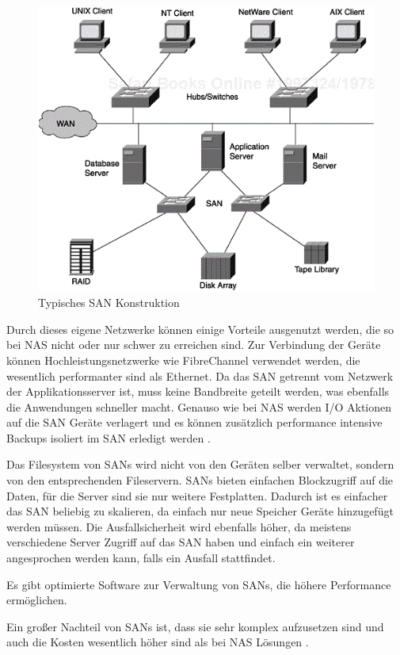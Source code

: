 \begin{figure}[hbt]
	\centering
	\includegraphics[scale=0.9]{images/storage-area-network}
	\caption{Typisches SAN Konstruktion \parencite[Kap. 1]{gupta.2002}}
	\label{fig:storageareanetwork}
\end{figure}

Durch dieses eigene Netzwerke können einige Vorteile ausgenutzt werden, die so bei NAS nicht oder nur schwer zu erreichen sind. Zur Verbindung der Geräte können Hochleistungsnetzwerke wie FibreChannel verwendet werden, die wesentlich performanter sind als Ethernet. Da das SAN getrennt vom Netzwerk der Applikationsserver ist, muss keine Bandbreite geteilt werden, was ebenfalls die Anwendungen schneller macht. Genauso wie bei NAS werden I/O Aktionen auf die SAN Geräte verlagert und es können zusätzlich performance intensive Backups isoliert im SAN erledigt werden \parencite[Kap. 1, SANs]{gupta.2002}.

Das Filesystem von SANs wird nicht von den Geräten selber verwaltet, sondern von den entsprechenden Fileservern. SANs bieten einfachen Blockzugriff auf die Daten, für die Server sind sie nur weitere Festplatten. Dadurch ist es einfacher das SAN beliebig zu skalieren, da einfach nur neue Speicher Geräte hinzugefügt werden müssen. Die Ausfallsicherheit wird ebenfalls höher, da meistens verschiedene Server Zugriff auf das SAN haben und einfach ein weiterer angesprochen werden kann, falls ein Ausfall stattfindet.

Es gibt optimierte Software zur Verwaltung von SANs, die höhere Performance ermöglichen.

Ein großer Nachteil von SANs ist, dass sie sehr komplex aufzusetzen sind und auch die Kosten wesentlich höher sind als bei NAS Lösungen \parencite[Kap. 2]{gupta.2002}.





